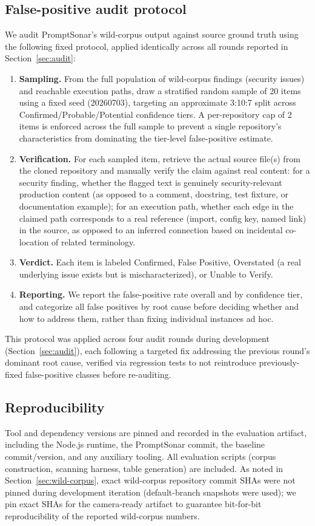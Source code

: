 \documentclass[sigconf,anonymous,review]{acmart}
\newcommand{\sysname}{PromptSonar}
\begin{document}
\subsection{False-positive audit protocol}
\label{sec:audit-protocol}
We audit \sysname{}'s wild-corpus output against source ground truth using the following fixed protocol, applied identically across all rounds reported in Section~\ref{sec:audit}:
\begin{enumerate}
\item \textbf{Sampling.} From the full population of wild-corpus findings (security issues) and reachable execution paths, draw a stratified random sample of 20 items using a fixed seed (20260703), targeting an approximate 3:10:7 split across Confirmed/Probable/Potential confidence tiers. A per-repository cap of 2 items is enforced across the full sample to prevent a single repository's characteristics from dominating the tier-level false-positive estimate.
\item \textbf{Verification.} For each sampled item, retrieve the actual source file(s) from the cloned repository and manually verify the claim against real content: for a security finding, whether the flagged text is genuinely security-relevant production content (as opposed to a comment, docstring, test fixture, or documentation example); for an execution path, whether each edge in the claimed path corresponds to a real reference (import, config key, named link) in the source, as opposed to an inferred connection based on incidental co-location of related terminology.
\item \textbf{Verdict.} Each item is labeled Confirmed, False Positive, Overstated (a real underlying issue exists but is mischaracterized), or Unable to Verify.
\item \textbf{Reporting.} We report the false-positive rate overall and by confidence tier, and categorize all false positives by root cause before deciding whether and how to address them, rather than fixing individual instances ad hoc.
\end{enumerate}
This protocol was applied across four audit rounds during development (Section~\ref{sec:audit}), each following a targeted fix addressing the previous round's dominant root cause, verified via regression tests to not reintroduce previously-fixed false-positive classes before re-auditing.

\subsection{Reproducibility}
\label{sec:repro}
Tool and dependency versions are pinned and recorded in the evaluation artifact, including the Node.js runtime, the \sysname{} commit, the baseline commit/version, and any auxiliary tooling. All evaluation scripts (corpus construction, scanning harness, table generation) are included. As noted in Section~\ref{sec:wild-corpus}, exact wild-corpus repository commit SHAs were not pinned during development iteration (default-branch snapshots were used); we pin exact SHAs for the camera-ready artifact to guarantee bit-for-bit reproducibility of the reported wild-corpus numbers.
\end{document}
